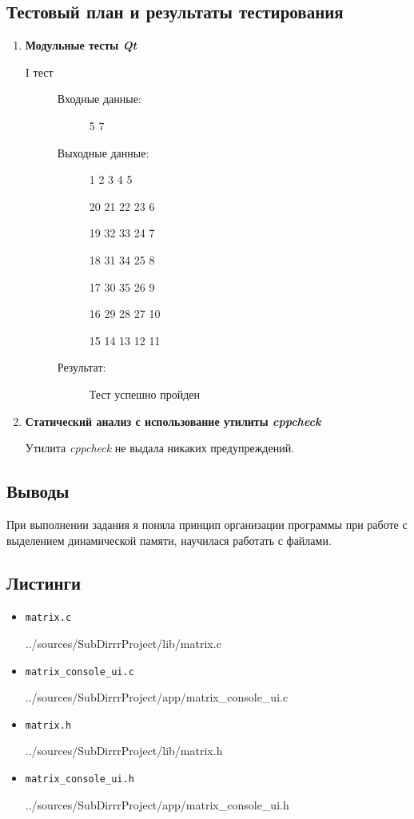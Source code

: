 \documentclass[12pt,a4paper]{report}
\begin{document}
\subsection{Тестовый план и результаты тестирования}
\hspace{\parindent}
\begin{enumerate}
\item \textbf{Модульные тесты \textit{Qt}}

\begin{description}
\item[I тест]
\hspace{\parindent}
\begin{flushleft}
\begin{description}
\item[Входные данные:] 5 7
\item[Выходные данные:]
\hspace{\parindent}
\begin{flushleft}
 1  2  3  4  5 

20 21 22 23  6

19 32 33 24  7

18 31 34 25  8

17 30 35 26  9

16 29 28 27 10

15 14 13 12 11
\end{flushleft}
\item[Результат:] Тест успешно пройден
\end{description}
\end{flushleft}
\end{description}
\item \textbf{Статический анализ с использование утилиты \textit{cppcheck}}

Утилита \textit{cppcheck} не выдала никаких предупреждений.
\end{enumerate}
\subsection{Выводы}
\hspace{\parindent}
При выполнении задания я поняла принцип организации программы при работе с выделением динамической памяти, научилася работать с файлами.
\subsection*{Листинги}
\begin{itemize}
\item[] \verb-matrix.c-

{../sources/SubDirrrProject/lib/matrix.c}
\item[] \verb-matrix_console_ui.c-

{../sources/SubDirrrProject/app/matrix_console_ui.c}
\item[] \verb-matrix.h-

{../sources/SubDirrrProject/lib/matrix.h}
\item[] \verb-matrix_console_ui.h-

{../sources/SubDirrrProject/app/matrix_console_ui.h}
\end{itemize}
\end{document}

